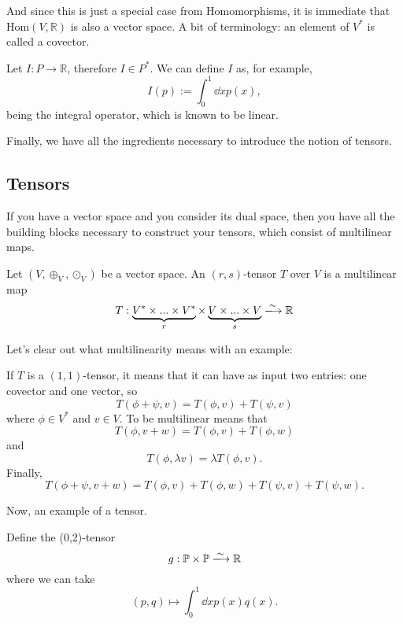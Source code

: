And since this is just a special case from Homomorphisms, it is immediate that $\text{Hom}(V,\mathbb{R})$ is also a vector space. A bit of terminology: an element of $V^*$ is called a covector.

\begin{example}
    Let $I : P \longrightarrow \mathbb{R}$, therefore $I \in P^*$. We can define $I$ as, for example,
    \[
        I(p) := \int_0^1 \dd{x} p(x),
    \]
    being the integral operator, which is known to be linear.
    \qedwhite
\end{example}

Finally, we have all the ingredients necessary to introduce the notion of tensors.

\subsection{Tensors}
If you have a vector space and you consider its dual space, then you have all the building blocks necessary to construct your tensors, which consist of multilinear maps.

\begin{definition}
    Let $(V, \oplus_V, \odot_V)$ be a vector space. An $(r,s)$-tensor $T$ over $V$ is a multilinear map
    \[
        T : \underbrace{V^* \times ... \times V^*}_{r} \times \underbrace{V \times ... \times V }_{s} \xlongrightarrow[]{\sim} \mathbb{R}
    \]
\end{definition}

Let's clear out what multilinearity means with an example:

\begin{example}
    If $T$ is a $(1,1)$-tensor, it means that it can have as input two entries: one covector and one vector, so
    \[
        T(\phi + \psi, v) = T(\phi, v) + T(\psi,v)
    \]
    where $\phi \in V^*$ and $v \in V$. To be multilinear means that
    \[
        T(\phi, v + w) = T(\phi, v) + T(\phi, w)
    \]
    and 
    \[
        T(\phi, \lambda v) = \lambda T(\phi, v).
    \]
    Finally,
    \[
        T(\phi + \psi, v + w) = T(\phi, v) + T(\phi, w) + T(\psi, v) + T(\psi, w).
    \]
    \qedwhite
\end{example}

Now, an example of a tensor.

\begin{example}
    Define the (0,2)-tensor
    \[
        g: \mathbb{P} \times \mathbb{P} \xlongrightarrow[]{\sim} \mathbb{R}
    \]
    where we can take
    \[
        (p,q) \longmapsto \int_0^1 \dd{x} p(x) q(x).
    \]
    \qedwhite
\end{example}

